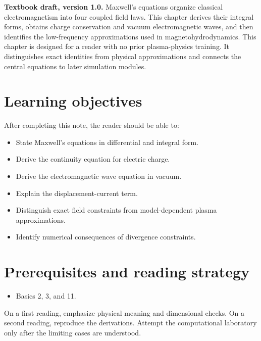 \documentclass[11pt]{article}
\begin{document}

\begin{overviewbox}
\textbf{Textbook draft, version 1.0.} Maxwell's equations organize classical electromagnetism into four coupled field laws. This chapter derives their integral forms, obtains charge conservation and vacuum electromagnetic waves, and then identifies the low-frequency approximations used in magnetohydrodynamics. This chapter is designed for a reader with no prior plasma-physics training. It distinguishes exact identities from physical approximations and connects the central equations to later simulation modules.
\end{overviewbox}

\ProjectTOC

\section{Learning objectives}
After completing this note, the reader should be able to:
\begin{itemize}[leftmargin=1.6em]
\item State Maxwell's equations in differential and integral form.
\item Derive the continuity equation for electric charge.
\item Derive the electromagnetic wave equation in vacuum.
\item Explain the displacement-current term.
\item Distinguish exact field constraints from model-dependent plasma approximations.
\item Identify numerical consequences of divergence constraints.
\end{itemize}

\section{Prerequisites and reading strategy}
\begin{itemize}[leftmargin=1.6em]
\item Basics 2, 3, and 11.
\end{itemize}
On a first reading, emphasize physical meaning and dimensional checks. On a second reading, reproduce the derivations. Attempt the computational laboratory only after the limiting cases are understood.
\end{document}
